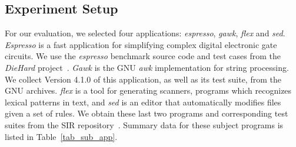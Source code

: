 \begin{table*}[htbp]
\centering
\caption{\emph{dlmalloc} selective shallow parameters made available by the developers and used in our experiments}
\label{tab_dlmalloc_parameters}
\end{table*}


\subsection{Experiment Setup}

For our evaluation, we selected four applications: \emph{espresso}, \emph{gawk}, \emph{flex} and \emph{sed}. \emph{Espresso} is a fast application for simplifying complex digital electronic gate circuits. We use the \emph{espresso} benchmark source code and test cases from the \emph{DieHard} project~\cite{Berger:2006:DPM:1133981.1134000}. \emph{Gawk} is the GNU \emph{awk} implementation for string processing. We collect Version 4.1.0 of this application, as well as its test suite, from the GNU archives. \emph{flex} is a tool for generating scanners, programs which recognizes lexical patterns in text, and \emph{sed} is an editor that automatically modifies files given a set of rules. We obtain these last two programs and corresponding test suites from the SIR repository~\cite{SIR2005}. Summary data for these subject programs is listed in Table~\ref{tab_sub_app}.

